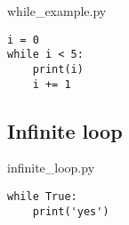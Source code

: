 \documentclass[aspectratio=1610,t]{beamer}
\begin{document}
\begin{pframe}
 \begin{minipage}{0.47\textwidth}
  \begin{center}
   
  \end{center}
 \end{minipage}%
 \begin{minipage}{0.47\textwidth}
  \begin{pythonfile}{while\_example.py}
   \begin{verbatim}
i = 0
while i < 5:
    print(i)
    i += 1
   \end{verbatim}
  \end{pythonfile}
  \begin{terminal}
  \end{terminal}
 \end{minipage}
\end{pframe}


\subsection{Infinite loop}
\begin{pframe}
 \begin{pythonfile}{infinite\_loop.py}
  \begin{verbatim}
while True:
    print('yes')
  \end{verbatim}
 \end{pythonfile}
 \begin{terminal}
 \end{terminal}
\end{pframe}
\end{document}
